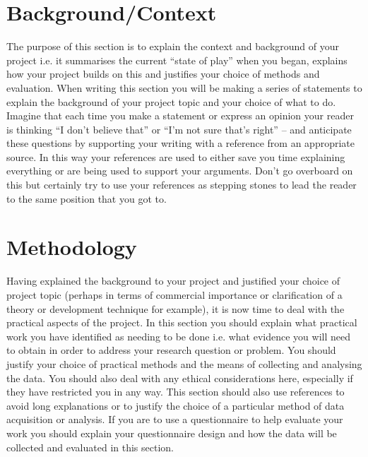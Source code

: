 \documentclass[a4paper, 12pt]{article}
\begin{document}
\pagebreak


\section{Background/Context} %
The purpose of this section is to explain the context and background of your project i.e. it summarises the current “state of play” when you began, explains how your project builds on this and justifies your choice of methods and evaluation. When writing this section you will be making a series of statements to explain the background of your project topic and your choice of what to do. Imagine that each time you make a statement or express an opinion your reader is thinking “I don’t believe that” or “I’m not sure that’s right” – and anticipate these questions by supporting your writing with a reference from an appropriate source. In this way your references are used to either save you time explaining everything or are being used to support your arguments. Don’t go overboard on this but certainly try to use your references as stepping stones to lead the reader to the same position that you got to.

\pagebreak


\section{Methodology} %
Having explained the background to your project and justified your choice of project topic (perhaps in terms of commercial importance or clarification of a theory or development technique for example), it is now time to deal with the practical aspects of the project. In this section you should explain what practical work you have identified as needing to be done i.e. what evidence you will need to obtain in order to address your research question or problem. You should justify your choice of practical methods and the means of collecting and analysing the data. You should also deal with any ethical considerations here, especially if they have restricted you in any way. This section should also use references to avoid long explanations or to justify the choice of a particular method of data acquisition or analysis. If you are to use a questionnaire to help evaluate your work you should explain your questionnaire design and how the data will be collected and evaluated in this section.

\pagebreak
\end{document}
